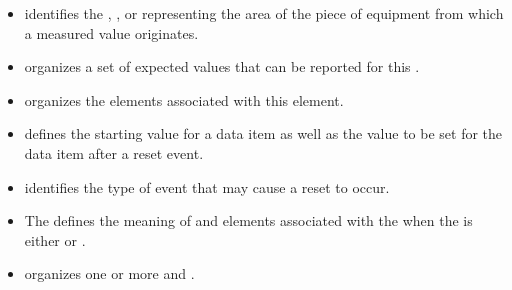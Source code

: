\begin{itemize}

\item {} \newline {} identifies the , , or  representing the area of the piece of equipment from which a measured value originates.

\item {} \newline {} \glspl{organize} a set of expected values that can be reported for this .

\item {} \newline {} \glspl{organize} the  elements associated with this  element. 

\item {} \newline {} defines the starting value for a data item as well as the value to be set for the data item after a reset event.

\item {} \newline {} identifies the type of event that may cause a reset to occur.

\item {} \newline The  defines the meaning of  and  elements associated with the  when the  is either  or .

\item {} \newline {} \glspl{organize} one or more  and .
\end{itemize}
